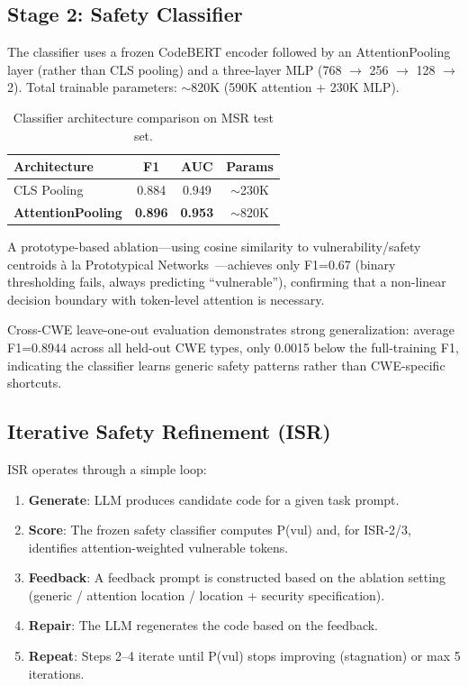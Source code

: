 \documentclass[10pt,conference]{IEEEtran}
\begin{document}
\subsection{Stage 2: Safety Classifier}

The classifier uses a frozen CodeBERT encoder followed by an AttentionPooling layer (rather than CLS pooling) and a three-layer MLP (768 $\rightarrow$ 256 $\rightarrow$ 128 $\rightarrow$ 2). Total trainable parameters: $\sim$820K (590K attention + 230K MLP).

\begin{table}[h]
\centering
\caption{Classifier architecture comparison on MSR test set.}
\begin{tabular}{lccc}
\toprule
Architecture & F1 & AUC & Params \\
\midrule
CLS Pooling & 0.884 & 0.949 & $\sim$230K \\
\textbf{AttentionPooling} & \textbf{0.896} & \textbf{0.953} & $\sim$820K \\
\bottomrule
\end{tabular}
\end{table}

A prototype-based ablation---using cosine similarity to vulnerability/safety centroids \`{a} la Prototypical Networks~\cite{protonet}---achieves only F1=0.67 (binary thresholding fails, always predicting ``vulnerable''), confirming that a non-linear decision boundary with token-level attention is necessary.

Cross-CWE leave-one-out evaluation demonstrates strong generalization: average F1=0.8944 across all held-out CWE types, only 0.0015 below the full-training F1, indicating the classifier learns generic safety patterns rather than CWE-specific shortcuts.

\subsection{Iterative Safety Refinement (ISR)}

ISR operates through a simple loop:

\begin{enumerate}
\item \textbf{Generate}: LLM produces candidate code for a given task prompt.
\item \textbf{Score}: The frozen safety classifier computes P(vul) and, for ISR-2/3, identifies attention-weighted vulnerable tokens.
\item \textbf{Feedback}: A feedback prompt is constructed based on the ablation setting (generic / attention location / location + security specification).
\item \textbf{Repair}: The LLM regenerates the code based on the feedback.
\item \textbf{Repeat}: Steps 2--4 iterate until P(vul) stops improving (stagnation) or max 5 iterations.
\end{enumerate}
\end{document}
